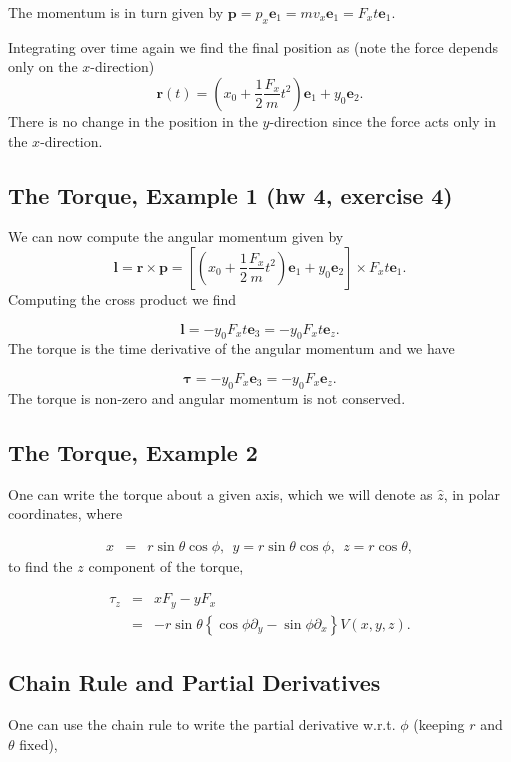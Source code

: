 \documentclass[%
oneside,                 %
final,                   %
10pt]{article}
\begin{document}
The momentum is in turn given by $\bm{p}=p_x\bm{e}_1=mv_x\bm{e}_1=F_xt\bm{e}_1$.

Integrating over time again we find the final position as (note the force depends only on the $x$-direction)
\[
\bm{r}(t)=(x_0+\frac{1}{2}\frac{F_x}{m}t^2) \bm{e}_1+y_0\bm{e}_2.
\]
There is no change in the position in the $y$-direction since the force acts only in the $x$-direction.

\subsection{The Torque, Example 1 (hw 4, exercise 4)}

We can now compute the angular momentum given by
\[
\bm{l}=\bm{r}\times\bm{p}=\left[(x_0+\frac{1}{2}\frac{F_x}{m}t^2) \bm{e}_1+y_0\bm{e}_2\right]\times F_xt\bm{e}_1.
\]
Computing the cross product we find

\[
\bm{l}=-y_0F_xt\bm{e}_3=-y_0F_xt\bm{e}_z.
\]
The torque is the time derivative of the angular momentum and we have

\[
\bm{\tau}=-y_0F_x\bm{e}_3=-y_0F_x\bm{e}_z.
\]
The torque is non-zero and angular momentum is not conserved.

\subsection{The Torque, Example 2}

One can write the torque about a given axis, which we will denote as $\hat{z}$, in polar coordinates, where

\begin{eqnarray}
x&=&r\sin\theta\cos\phi,~~y=r\sin\theta\cos\phi,~~z=r\cos\theta,
\end{eqnarray}
to find the $z$ component of the torque,

\begin{eqnarray}
\tau_z&=&xF_y-yF_x\\
\nonumber
&=&-r\sin\theta\left\{\cos\phi \partial_y-\sin\phi \partial_x\right\}V(x,y,z).
\end{eqnarray}

\subsection{Chain Rule and Partial Derivatives}

One can use the chain rule to write the partial derivative w.r.t. $\phi$ (keeping $r$ and $\theta$ fixed),
\end{document}
